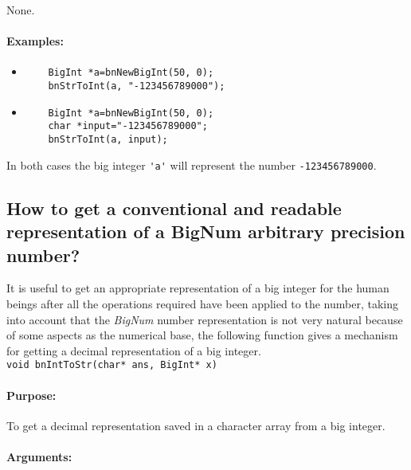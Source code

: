 \documentclass{book}
\begin{document}
None.

\paragraph{Examples:}

\begin{itemize}
\item

\begin{verbatim}
	BigInt *a=bnNewBigInt(50, 0);
	bnStrToInt(a, "-123456789000");
\end{verbatim}

\item

\begin{verbatim}
	BigInt *a=bnNewBigInt(50, 0);
	char *input="-123456789000";
	bnStrToInt(a, input);
\end{verbatim}
\end{itemize}

In both cases the big integer \verb+'a'+ will represent the number \verb+-123456789000+.

\subsection{How to get a conventional and readable representation of a BigNum arbitrary precision number?}

It is useful to get an appropriate representation of a big integer for the human beings after all the operations required have been applied to the number, taking into account that the \emph{BigNum} number representation is not very natural because of some aspects as the numerical base, the following function gives a mechanism for getting a decimal representation of a big integer.\\

\verb+void bnIntToStr(char* ans, BigInt* x)+\\

\paragraph{Purpose:} 

To get a decimal representation saved in a character array from a big integer.

\paragraph{Arguments:}
\end{document}
